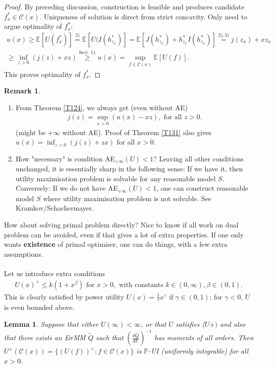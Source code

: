\documentclass[12pt,a4paper, twoside]{article}
\newtheorem{lem}{Lemma}[section]
\theoremstyle{definition}
\newtheorem{rem}{Remark}[section]
\newcommand{\EE}{\mathbb{E}} %
\newcommand{\PP}{\mathbb{P}} %
\begin{document}
\begin{proof}
By preceding  discussion, construction is feasible and produces candidate $f_x^* \in \mathcal{C}(x)$. Uniqueness of solution is direct from strict concavity. Only need to argue optimality of $f_x^*$: 
\begin{align*}
u(x) \geq \EE[U(f_x^*)] \overset{2)}= \EE[U(I(h_{z_x}^*)] = \EE[J(h_{z_x}^*) + h_{z_x}^*I(h_{z_x}^*)] \overset{2),3)}= j(z_x) + xz_x \\ \geq \inf_{z >0} (j(z) + xz) \overset{\text{Sect. 11}}\geq u(x) = \sup_{f \in \mathcal{C}(x)} \EE[U(f)].
\end{align*}
This proves optimality of $f_x^*$. 
\end{proof}
\begin{rem} \
\begin{enumerate}
\item From Theorem \ref{T124}, we always get (even without AE) 
\begin{align*}
j(z)= \sup_{x >0} (u(x)-xz), \text{ for all } z>0.
\end{align*}
(might be $+ \infty$ without AE). Proof of Theorem \ref{T131} also gives $u(x) = \inf_{z >0} (j(z) + zx)$ for all $x>0$. 
\item How "necessary" is condition AE$_{+ \infty}(U) <1$? Leaving all other conditions unchanged, it is essentially sharp in the following sense: If we have it, then utility maximisation problem is solvable for any reasonable model $S$. Conversely: If we do not have AE$_{+ \infty}(U)<1$, one can construct reasonable model $S$ where utility maximisation problem is not solvable. See Kramkov/Schachermayer.
\end{enumerate}
\end{rem}
How about solving primal problem directly? Nice to know if all work on dual problem can be avoided, even if that gives a lot of extra properties. If one only wants \textbf{existence} of primal optimiser, one can do things, with a few extra assumptions.
\\\\
Let us introduce extra conditions 
\begin{align*}
U(x)^+ \leq k(1 + x^\beta) \text{ for } x>0, \text{ with constants } k \in (0, \infty), \beta \in (0,1). \tag{$U+$}
\end{align*}
This is clearly satisfied by power utility $U(x)= \frac{1}{\gamma}x^\gamma$ if $\gamma \in (0, 1)$; for $\gamma<0$, $U$ is even bounded above. 
\begin{lem} \label{L132} Suppose that either $U( \infty) < \infty$, or that $U$ satisfies ($U+)$ and also that there exists an E$\sigma$MM $\widetilde{Q}$ such that $( \frac{d \widetilde{Q}}{d \PP})^{-1}$ has moments of all orders. Then $U^+( \mathcal{C}(x)) = \{ (U(f))^+ : f \in \mathcal{C}(x)\}$ is $\PP$-UI (uniformly integrable) for all $x>0$. 
\end{lem}
\end{document}
